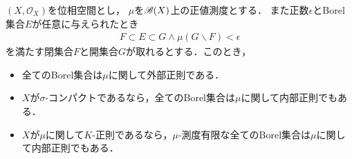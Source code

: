 		\begin{screen}
			\begin{thm}[閉集合と開集合で近似できるなら正則]
				$(X,\mathscr{O}_X)$を位相空間とし，
				$\mu$を$\mathscr{B}(X)$上の正値測度とする．
				また正数$\epsilon$とBorel集合$E$が任意に与えられたとき
				\begin{align}
					F \subset E \subset G \wedge \mu(G \backslash F) < \epsilon
				\end{align}
				を満たす閉集合$F$と開集合$G$が取れるとする．このとき，
				\begin{itemize}
					\item 全てのBorel集合は$\mu$に関して外部正則である．
					
					\item $X$が$\sigma$-コンパクトであるなら，全てのBorel集合は$\mu$に関して内部正則でもある．
					
					\item $X$が$\mu$に関して$K$-正則であるなら，$\mu$-測度有限な全てのBorel集合は$\mu$に関して内部正則でもある．
				\end{itemize}
			\end{thm}
		\end{screen}
		
